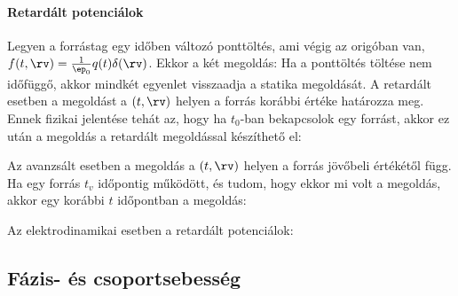    \paragraph{Retardált potenciálok}
    
    Legyen a forrástag egy időben változó ponttöltés, ami végig az origóban van, $f(t,\rv)=\frac{1}{\ep_0}q(t)\delta(\rv)$.
   Ekkor a két megoldás:
    Ha a ponttöltés töltése nem időfüggő, akkor mindkét egyenlet visszaadja a statika megoldását.
   A retardált esetben a megoldást a $(t,\rv)$ helyen a forrás korábbi értéke határozza meg.
   Ennek fizikai jelentése tehát az, hogy ha $t_0$-ban bekapcsolok egy forrást, akkor ez után a megoldás a retardált megoldással készíthető el:
    
    Az avanzsált esetben a megoldás a $(t,\rv)$ helyen a forrás jövőbeli értékétől függ.
   Ha egy forrás $t_v$ időpontig működött, és tudom, hogy ekkor mi volt a megoldás, akkor egy korábbi $t$ időpontban a megoldás:
    
    Az elektrodinamikai esetben a retardált potenciálok:
    
  \subsection{Fázis- és csoportsebesség}
   

